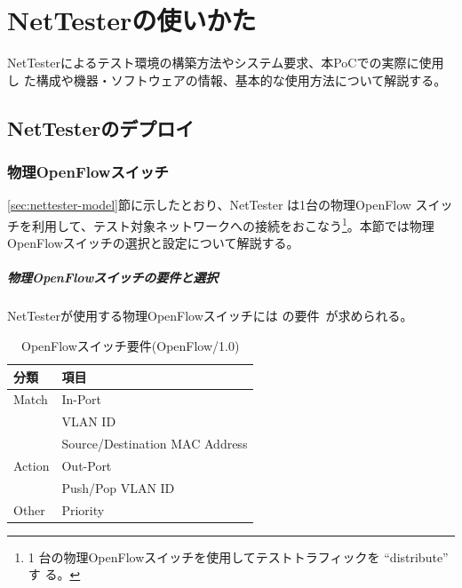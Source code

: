
\chapter{NetTesterの使いかた}
\label{chap:nettester-usage}

NetTesterによるテスト環境の構築方法やシステム要求、本PoCでの実際に使用し
た構成や機器・ソフトウェアの情報、基本的な使用方法について解説する。

 \section{NetTesterのデプロイ}
 \label{sec:nettester-deployment}

  \subsection{物理OpenFlowスイッチ}
  \label{sec:nettester-deploy-psw}


\ref{sec:nettester-model}節に示したとおり、NetTester は1台の物理OpenFlow
スイッチを利用して、テスト対象ネットワークへの接続をおこなう\footnote{1
台の物理OpenFlowスイッチを使用してテストトラフィックを ``distribute'' す
る。}。本節では物理OpenFlowスイッチの選択と設定について解説する。

    \paragraph{物理OpenFlowスイッチの要件と選択}
NetTesterが使用する物理OpenFlowスイッチには
の要件~\cite{l1pjpoc}が求められる。

\begin{table}[h]
 \centering
 \caption{OpenFlowスイッチ要件(OpenFlow/1.0)}
 \label{tab:ofs-requirement}
 \begin{tabular}{l|l}
  \hline
  分類 & 項目 \\
  \hline
  \hline
  Match  & In-Port \\ \cline{2-2}
         & VLAN ID \\ \cline{2-2}
         & Source/Destination MAC Address \\ \hline
  Action & Out-Port \\ \cline{2-2}
         & Push/Pop VLAN ID \\ \hline
  Other & Priority \\
  \hline
 \end{tabular}
\end{table}

